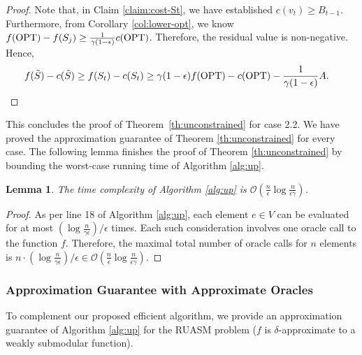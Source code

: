 \documentclass[10pt]{article} %
\newtheorem{lemma}[theorem]{Lemma}
\theoremstyle{remark}
\newcommand{\OPT}{{\rm OPT}}
\begin{document}
\begin{proof}
Note that, in Claim \ref{claim:cost-St}, we have established $c(v_t)\geq B_{t-1}$. Furthermore, from Corollary \ref{col:lower-opt}, we know
$f(\OPT) - f(S_j) \geq \frac{1}{\gamma(1-\epsilon)}{c(\OPT)}$. Therefore, 
the residual value is non-negative. Hence, 
\begin{align*}
   &f(\Tilde{S})-c(\Tilde{S}) \geq f(S_t)-c(S_t)\geq \gamma(1-\epsilon)f(\OPT)-c(\OPT)-\frac{1}{\gamma (1-\epsilon)}A.
\end{align*}
\end{proof}
This concludes the proof of Theorem~\ref{th:unconstrained} for case 2.2. We have proved the approximation guarantee of Theorem \ref{th:unconstrained} for every case. The following lemma finishes the proof of Theorem \ref{th:unconstrained} by bounding the worst-case running time of Algorithm \ref{alg:up}. 

\begin{lemma}
    \label{lem:time}
    The time complexity of Algorithm \ref{alg:up} is 
    $\mathcal{O}(\frac{n}{\epsilon} \log \frac{n}{\epsilon \gamma})$.
\end{lemma}
\begin{proof}
    As per line 18 of Algorithm \ref{alg:up}, each element $e \in V$ can be evaluated for at most $(\log \frac{n}{\gamma \epsilon})/{\epsilon}$ times. Each such consideration involves one oracle call to the function $f$. Therefore, the maximal total number of oracle calls for $n$ elements is $n \cdot (\log \frac{n}{\gamma \epsilon})/{\epsilon} \in \mathcal{O}(\frac{n}{\epsilon} \log \frac{n}{\epsilon \gamma})$. 
\end{proof}


\subsubsection{Approximation Guarantee with Approximate Oracles}
To complement our proposed efficient algorithm, we provide an approximation guarantee of Algorithm \ref{alg:up} for the RUASM problem ($f$ is $\delta$-approximate to a weakly submodular function). 
\end{document}
